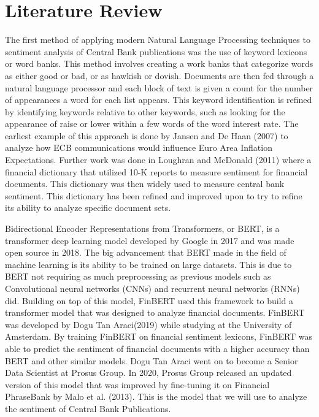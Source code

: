\documentclass [12pt]{article}
\begin{document}
\section{Literature Review}
The first method of applying modern Natural Language Processing techniques to sentiment analysis of Central Bank publications was the use of keyword lexicons or word banks. This method involves creating a work banks that categorize words as either good or bad, or as hawkish or dovish. Documents are then fed through a natural language processor and each block of text is given a count for the number of appearances a word for each list appears. This keyword identification is refined by identifying keywords relative to other keywords, such as looking for the appearance of raise or lower within a few words of the word interest rate. The earliest example of this approach is done by Jansen and De Haan (2007)\cite{Jacob07} to analyze how ECB communications would influence Euro Area Inflation Expectations. Further work was done in Loughran and McDonald (2011)\cite{Tim11} where a financial dictionary that utilized 10-K reports to measure sentiment for financial documents. This dictionary was then widely used to measure central bank sentiment. This dictionary has been refined and improved upon to try to refine its ability to analyze specific document sets. 

Bidirectional Encoder Representations from Transformers, or BERT, is a transformer deep learning model developed by Google in 2017 and was made open source in 2018. The big advancement that BERT made in the field of machine learning is its ability to be trained on large datasets. This is due to BERT not requiring as much preprocessing as previous models such as Convolutional neural networks (CNNs) and recurrent neural networks (RNNs) did. Building on top of this model, FinBERT used this framework to build a transformer model that was designed to analyze financial documents. FinBERT was developed by Dogu Tan Araci(2019)\cite{finbert19} while studying at the University of Amsterdam. By training FinBERT on financial sentiment lexicons, FinBERT was able to predict the sentiment of financial documents with a higher accuracy than BERT and other similar models. Dogu Tan Araci went on to become a Senior Data Scientist at Prosus Group. In 2020, Prosus Group released an updated version of this model that was improved by fine-tuning it on Financial PhraseBank by Malo et al. (2013)\cite{malo14}. This is the model that we will use to analyze the sentiment of Central Bank Publications. 
\end{document}
